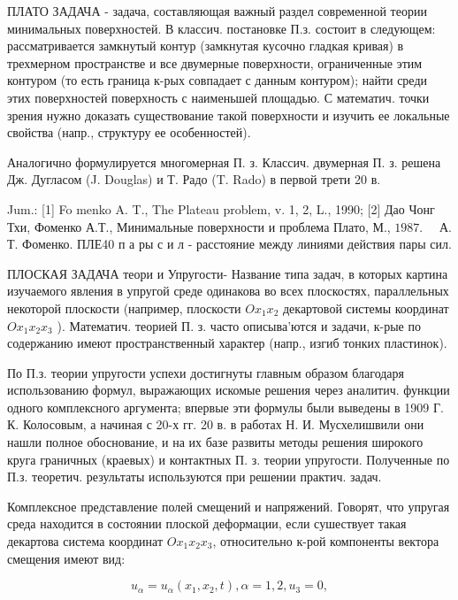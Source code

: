 \documentclass[10pt]{article}
\begin{document}
ПЛАТО ЗАДАЧА - задача, составляющая важный раздел современной теории минимальных поверхностей. В классич. постановке П.з. состоит в следующем: рассматривается замкнутый контур (замкнутая кусочно гладкая кривая) в трехмерном пространстве и все двумерные поверхности, ограниченные этим контуром (то есть граница к-рых совпадает с данным контуром); найти среди этих поверхностей поверхность с наименьшей площадью. С математич. точки зрения нужно доказать существование такой поверхности и изучить ее локальные свойства (напр., структуру ее особенностей).



Аналогично формулируется многомерная П. з. Классич. двумерная П. з. решена Дж. Дугласом (J. Douglas) и Т. Радо (T. Rado) в первой трети 20 в.



Jum.: [1] Fo menko A. T., The Plateau problem, v. 1, 2, L., 1990; [2] Дао Чонг Тхи, Фоменко А.Т., Минимальные поверхности и проблема Плато, М., $1987 . \quad$ А. Т. Фоменко. ПЛЕ40 п а ры с и л - расстояние между линиями действия пары сил.



ПЛОСКАЯ ЗАДАЧА теори и Упругости- Название типа задач, в которых картина изучаемого явления в упругой среде одинакова во всех плоскостях, параллельных некоторой плоскости (например, плоскости $O x_{1} x_{2}$ декартовой системы координат $O x_{1} x_{2} x_{3}$ ). Математич. теорией П. з. часто описыва'ются и задачи, к-рые по содержанию имеют пространственный характер (напр., изгиб тонких пластинок).



По П.з. теории упругости успехи достигнуты главным образом благодаря использованию формул, выражающих искомые решения через аналитич. функции одного комплексного аргумента; впервые эти формулы были выведены в 1909 Г. К. Колосовым, а начиная с 20-х гг. 20 в. в работах Н. И. Мусхелишвили они нашли полное обоснование, и на их базе развиты методы решения широкого круга граничных (краевых) и контактных П. з. теории упругости. Полученные по П.з. теоретич. результаты используются при решении практич. задач.



Комплексное представление полей смещений и напряжений. Говорят, что упругая среда находится в состоянии плоской деформации, если сушествует такая декартова система координат $O x_{1} x_{2} x_{3}$, относительно к-рой компоненты вектора смещения имеют вид:



\[

u_{\alpha}=u_{\alpha}\left(x_{1}, x_{2}, t\right), \alpha=1,2, u_{3}=0,

\]
\end{document}
